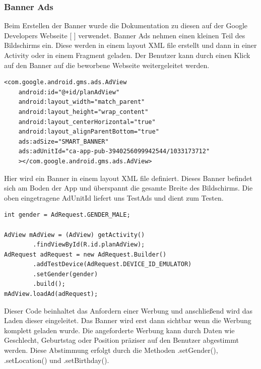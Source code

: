 \documentclass[FIPLY_base.tex]{subfiles}
\begin{document}
\subsubsection{Banner Ads}
Beim Erstellen der Banner wurde die Dokumentation zu diesen auf der Google Developers Webseite [ \cite{gdBanner}] verwendet. \newline 
Banner Ads nehmen einen kleinen Teil des Bildschirms ein. Diese werden in einem layout XML file erstellt und dann in einer Activity oder in einem Fragment geladen. Der Benutzer kann durch einen Klick auf den Banner auf die beworbene Webseite weitergeleitet werden.
\ \\
\begin{lstlisting}
<com.google.android.gms.ads.AdView
    android:id="@+id/planAdView"
    android:layout_width="match_parent"
    android:layout_height="wrap_content"
    android:layout_centerHorizontal="true"
    android:layout_alignParentBottom="true"
    ads:adSize="SMART_BANNER"
    ads:adUnitId="ca-app-pub-3940256099942544/1033173712"
    ></com.google.android.gms.ads.AdView>
\end{lstlisting}
Hier wird ein Banner in einem layout XML file definiert. Dieses Banner befindet sich am Boden der App und überspannt die gesamte Breite des Bildschirms.
Die oben eingetragene AdUnitId liefert uns TestAds und dient zum Testen.
\ \\
\begin{lstlisting}
int gender = AdRequest.GENDER_MALE;

AdView mAdView = (AdView) getActivity()
        .findViewById(R.id.planAdView);
AdRequest adRequest = new AdRequest.Builder()
        .addTestDevice(AdRequest.DEVICE_ID_EMULATOR)
        .setGender(gender)
        .build();
mAdView.loadAd(adRequest);
\end{lstlisting}
Dieser Code beinhaltet das Anfordern einer Werbung und anschließend wird das Laden dieser eingeleitet.
Das Banner wird erst dann sichtbar wenn die Werbung komplett geladen wurde. %
Die angeforderte Werbung kann durch Daten wie Geschlecht, Geburtstag oder Position präziser auf den Benutzer abgestimmt werden.
Diese Abstimmung erfolgt durch die Methoden .setGender(), .setLocation() und .setBirthday().	

\newpage
\end{document}
